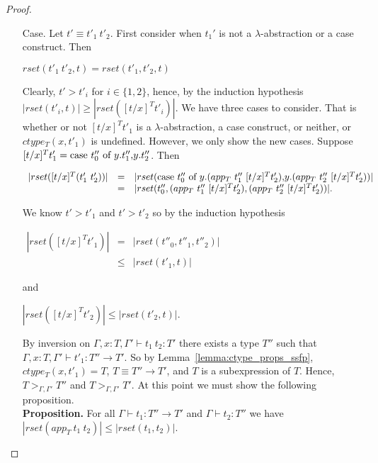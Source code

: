 \begin{proof}
\begin{itemize}
\item[Case.] Let $t' \equiv t'_1\ t'_2$.  First consider when $t_1'$ is not a $\lambda$-abstraction or a case construct. Then
  \begin{center}
    $rset(t'_1\ t'_2, t) = rset(t'_1, t'_2, t)$
  \end{center}  
  Clearly,  $t' > t'_i$ for $i \in \{1,2\}$, hence, by the induction hypothesis $|rset(t'_i,t)| \geq |rset([t/x]^T t'_i)|$.  
  We have three cases to consider.  That is whether or not $[t/x]^T t'_1$ is a $\lambda$-abstraction, 
  a case construct, or neither, or $ctype_T(x,t'_1)$ is undefined. However, we only show the new cases. 
  Suppose $[t/x]^T t'_1 = \mbox{case}\ t''_0\ \text{of}\ y\text{.}t''_1\text{,}y\text{.}t''_2$. Then 
  \begin{center}
    \small
    \begin{math}
      \begin{array}{lll}
        |rset([t/x]^T (t'_1\ t'_2))| & = & |rset(\ccon{t''_0}{y}{(app_T\ t''_1\ [t/x]^T t'_2)}{(app_T\ t''_2\ [t/x]^T t'_2)})|\\
        & = & |rset(t''_0, (app_T\ t''_1\ [t/x]^T t'_2), (app_T\ t''_2\ [t/x]^T t'_2))|.
      \end{array}
    \end{math}
  \end{center}
  We know $t' > t'_1$ and $t' > t'_2$ so by the induction hypothesis
  \begin{center}
    \begin{math}
      \begin{array}{lll}
        |rset([t/x]^T t'_1)| & =    & |rset(t''_0, t''_1,t''_2)|\\
        & \leq & |rset(t'_1,t)|
      \end{array}
    \end{math}
  \end{center}
  and
  \begin{center}
    \begin{math}
      |rset([t/x]^T t'_2)| \leq |rset(t'_2,t)|.
    \end{math}
  \end{center}
  By inversion on $\Gamma,x:T,\Gamma' \vdash t_1\ t_2:T'$ there exists a type $T''$ such that
  $\Gamma,x:T,\Gamma' \vdash t'_1:T'' \to T'$.  So by Lemma~\ref{lemma:ctype_props_ssfp},
  $ctype_T(x,t'_1) = T$, $T \equiv T'' \to T'$, and $T$ is a subexpression of $T$.  Hence,
  $T >_{\Gamma,\Gamma'} T''$ and $T >_{\Gamma,\Gamma'} T'$.  At this point we must show the following
  proposition.
  \ \\
  {\bf Proposition.}  For all $\Gamma \vdash t_1:T'' \to T'$ and $\Gamma \vdash t_2:T''$ we have \\
  $|rset(app_T\ t_1\ t_2)| \leq |rset(t_1,t_2)|$.
  

\end{itemize}
\end{proof}
